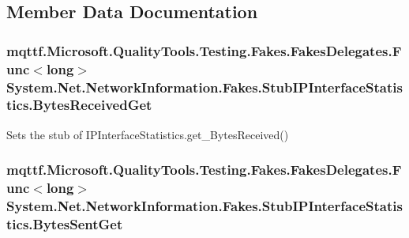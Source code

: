 \subsection{Member Data Documentation}
\hypertarget{class_system_1_1_net_1_1_network_information_1_1_fakes_1_1_stub_i_p_interface_statistics_a34ad7a869bd8be09a0e51015436ddfaf}{
\subsubsection[{Bytes\-Received\-Get}]{\setlength{\rightskip}{0pt plus 5cm}mqttf.\-Microsoft.\-Quality\-Tools.\-Testing.\-Fakes.\-Fakes\-Delegates.\-Func$<$long$>$ System.\-Net.\-Network\-Information.\-Fakes.\-Stub\-I\-P\-Interface\-Statistics.\-Bytes\-Received\-Get}}\label{class_system_1_1_net_1_1_network_information_1_1_fakes_1_1_stub_i_p_interface_statistics_a34ad7a869bd8be09a0e51015436ddfaf}


Sets the stub of I\-P\-Interface\-Statistics.\-get\-\_\-\-Bytes\-Received()

\hypertarget{class_system_1_1_net_1_1_network_information_1_1_fakes_1_1_stub_i_p_interface_statistics_af04c37eae45a855df545e87c64bf0b37}{
\subsubsection[{Bytes\-Sent\-Get}]{\setlength{\rightskip}{0pt plus 5cm}mqttf.\-Microsoft.\-Quality\-Tools.\-Testing.\-Fakes.\-Fakes\-Delegates.\-Func$<$long$>$ System.\-Net.\-Network\-Information.\-Fakes.\-Stub\-I\-P\-Interface\-Statistics.\-Bytes\-Sent\-Get}}\label{class_system_1_1_net_1_1_network_information_1_1_fakes_1_1_stub_i_p_interface_statistics_af04c37eae45a855df545e87c64bf0b37}


